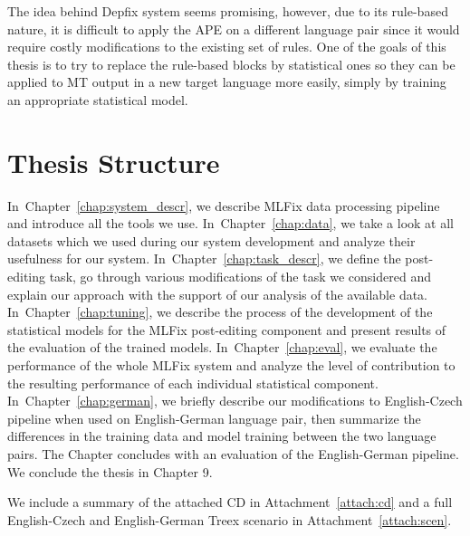 The idea behind Depfix system seems promising, however, due to its rule-based nature, it is difficult
to apply the APE on a different language pair since it would require costly modifications to the
existing set of rules. One of the goals of this thesis is to try to replace the rule-based blocks
by statistical ones so they can be applied to 
MT output in a new target language more easily, simply
by training an appropriate statistical model.


\section{Thesis Structure}

In~Chapter~\ref{chap:system_descr}, we describe MLFix data processing
pipeline and introduce all the tools we use.
In~Chapter~\ref{chap:data}, we take a look at all datasets which we used during our system
development and analyze their usefulness for our system.
In~Chapter~\ref{chap:task_descr}, we define the post-editing task, go through
various modifications of the task we considered and explain our
approach with the support of our analysis of the available data.
In~Chapter~\ref{chap:tuning}, we describe the process of the development
of the statistical models for the MLFix post-editing component and present
results of the evaluation of the trained models.
In~Chapter~\ref{chap:eval}, we evaluate the performance of the whole MLFix system
and analyze the level of contribution to the resulting performance
of each individual statistical component.
In~Chapter~\ref{chap:german}, we briefly describe our modifications to English-Czech pipeline
when used on English-German language pair, then summarize the differences
in the training data and model training between the two language pairs. The Chapter concludes with an evaluation of the English-German pipeline.
We conclude the thesis in Chapter 9.

We include a summary of the attached CD in Attachment~\ref{attach:cd} and a full English-Czech and English-German Treex scenario in Attachment~\ref{attach:scen}.


